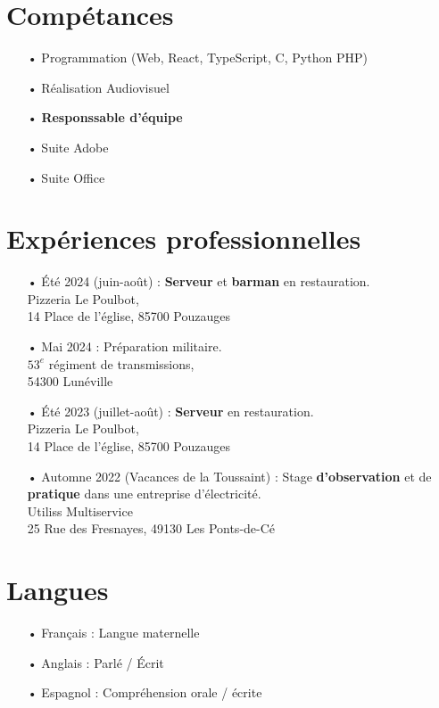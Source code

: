 \documentclass[french]{article}
\begin{document}
\section*{Compétances}
\begin{itemize}
	\item[•] Programmation (Web, React, TypeScript, C, Python PHP)
	\item[•] Réalisation Audiovisuel
	\item[•] \textbf{Responssable d'équipe}
	\item[•] Suite Adobe
	\item[•] Suite Office
\end{itemize}

\section*{Expériences professionnelles}
\begin{itemize}
	\item[• Été 2024 (juin-août) :] \textbf{Serveur} et \textbf{barman} en restauration. \\ Pizzeria Le Poulbot, \\ 14 Place de l'église, 85700 Pouzauges

	\item[• Mai 2024 :] Préparation militaire. \\ $53^{e}$ régiment de transmissions, \\ 54300 Lunéville
	
	\item[• Été 2023 (juillet-août) :] \textbf{Serveur} en restauration. \\ Pizzeria Le Poulbot, \\ 14 Place de l'église, 85700 Pouzauges

	\item[• Automne 2022 (Vacances de la Toussaint) :] Stage \textbf{d'observation} et de \textbf{pratique} dans une entreprise d'électricité. \\ Utiliss Multiservice \\ 25 Rue des Fresnayes, 49130 Les Ponts-de-Cé
\end{itemize}

\section*{Langues}
\begin{itemize}
	\item[• Français :] Langue maternelle
	
	\item[• Anglais :] Parlé / Écrit

	\item[• Espagnol :] Compréhension orale / écrite
\end{itemize}
\end{document}
